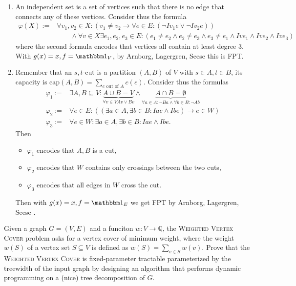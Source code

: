 \documentclass{article}
\begin{document}
\begin{solving}
\begin{enumerate}
        \item An independent set is a set of vertices such that there is no edge that connects any of these vertices. Consider thus the formula \begin{align*}
            \varphi(X) :=& \forall v_1,v_2\in X: \left(v_1\neq v_2\to \forall e\in E: \left(\lnot Iv_1e\lor \lnot Iv_2e\right)\right)\\
            &\qquad \land\forall v\in X \exists e_1, e_2, e_3 \in E: \left(e_1\neq e_2\land e_2\neq e_3\land e_3\neq e_1 \land Ive_1 \land Ive_2\land Ive_3 \right)
        \end{align*}
        where the second formula encodes that vertices all contain at least degree 3. With $g(x)= x, f = \mathbbm 1_V$, by  Arnborg, Lagergren, Seese this is FPT.
        \item Remember that an $s,t$-cut is a partition $(A, B)$ of $V$ with $s\in A, t\in B$, its capacity is $\mathrm{cap}(A,B) = \sum_{e\text{ out of }A} c(e)$. Consider thus the formulas \begin{align*}
            \varphi_1 := & \exists A,B\subseteq V: \underbrace{A\cup B = V}_{\forall v\in V Av\lor Bv}\land \underbrace{A\cap B = \emptyset}_{\forall a\in A: \lnot Ba\land \forall b\in B: \lnot Ab} \\
            \varphi_2 := & \forall e\in E: \left(\left(\exists a \in A, \exists b\in B: Iae\land Ibe\right)\to e\in W\right)\\
            \varphi_3:= & \forall e\in W: \exists a\in A,\exists b\in B: Iae\land Ibe.
        \end{align*}
        Then \begin{itemize}
            \item $\varphi_1$ encodes that $A, B$ is a cut,
            \item $\varphi_2$ encodes that $W$ contains only crossings between the two cuts,
            \item $\varphi_3$ encodes that all edges in $W$ cross the cut.
        \end{itemize}
        Then with $g(x) = x, f=\mathbbm1_{E}$ we get FPT by  Arnborg, Lagergren, Seese .
    \end{enumerate}
\end{solving}
\newpage

\begin{exercise}
    Given a graph $G=(V,E)$ and a funciton $w: V\to \mathbb Q$, the \textsc{Weighted Vertex Cover} problem asks for a vertex cover of minimum weight, where the weight $w(S)$ of a vertex set $S\subseteq V$ is defined as $w(S) = \sum_{v\in S} w(v)$. Prove that the \textsc{Weighted Vertex Cover} is fixed-parameter tractable parameterized by the treewidth of the input graph by designing an algorithm that performs dynamic programming on a (nice) tree decomposition of $G$.
\end{exercise}
\newpage
\end{document}
